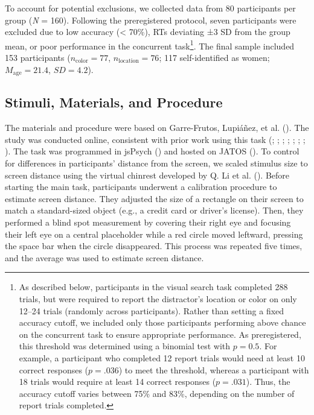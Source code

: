 \documentclass[
  man,
  floatsintext,
  longtable,
  nolmodern,
  notxfonts,
  notimes,
  mask,
  colorlinks=true,linkcolor=blue,citecolor=blue,urlcolor=blue]{apa7}
\begin{document}
To account for potential exclusions, we collected data from 80
participants per group (\emph{N} = 160). Following the preregistered
protocol, seven participants were excluded due to low accuracy
(\textless{} 70\%), RTs deviating ±3 SD from the group mean, or poor
performance in the concurrent task\footnote{As described below,
  participants in the visual search task completed 288 trials, but were
  required to report the distractor's location or color on only 12--24
  trials (randomly across participants). Rather than setting a fixed
  accuracy cutoff, we included only those participants performing above
  chance on the concurrent task to ensure appropriate performance. As
  preregistered, this threshold was determined using a binomial test
  with \(p = 0.5\). For example, a participant who completed 12 report
  trials would need at least 10 correct responses (\(p = .036\)) to meet
  the threshold, whereas a participant with 18 trials would require at
  least 14 correct responses (\(p = .031\)). Thus, the accuracy cutoff
  varies between 75\% and 83\%, depending on the number of report trials
  completed.}. The final sample included 153 participants
(\(n_{\text{color}} = 77\), \(n_{\text{location}} = 76\); 117
self-identified as women; \(M_{\text{age}} = 21.4\), \(SD = 4.2\)).

\subsection{Stimuli, Materials, and
Procedure}\label{stimuli-materials-and-procedure}

The materials and procedure were based on Garre-Frutos, Lupiáñez, et al.
(). The study was conducted
online, consistent with prior work using this task
(;
;
;
;
;
;
;
). The task was programmed
in jsPsych () and hosted on
JATOS (). To control for
differences in participants' distance from the screen, we scaled
stimulus size to screen distance using the virtual chinrest developed by
Q. Li et al. (). Before starting the main
task, participants underwent a calibration procedure to estimate screen
distance. They adjusted the size of a rectangle on their screen to match
a standard-sized object (e.g., a credit card or driver's license). Then,
they performed a blind spot measurement by covering their right eye and
focusing their left eye on a central placeholder while a red circle
moved leftward, pressing the space bar when the circle disappeared. This
process was repeated five times, and the average was used to estimate
screen distance.
\end{document}
